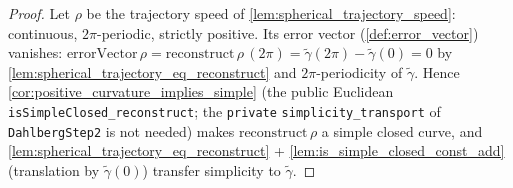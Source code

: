 \begin{proof}
        \leanok
  Let $\rho$ be the trajectory speed of \cref{lem:spherical_trajectory_speed}:
  continuous, $2\pi$-periodic, strictly positive. Its error vector
  (\cref{def:error_vector}) vanishes:
  $\mathrm{errorVector}\,\rho=\mathrm{reconstruct}\,\rho\,(2\pi)
  =\tilde\gamma(2\pi)-\tilde\gamma(0)=0$ by \cref{lem:spherical_trajectory_eq_reconstruct} and
  $2\pi$-periodicity of $\tilde\gamma$. Hence
  \cref{cor:positive_curvature_implies_simple} (the public Euclidean
  \texttt{isSimpleClosed\_reconstruct}; the \texttt{private}
  \texttt{simplicity\_transport} of \texttt{DahlbergStep2} is not needed) makes
  $\mathrm{reconstruct}\,\rho$ a simple closed curve, and
  \cref{lem:spherical_trajectory_eq_reconstruct} +
  \cref{lem:is_simple_closed_const_add} (translation by $\tilde\gamma(0)$) transfer
  simplicity to $\tilde\gamma$.
\end{proof}
